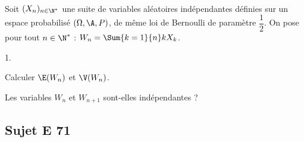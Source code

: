 \documentclass[11pt]{article}%
\begin{document}

\begin{exerciceSP}~\\
  Soit $(X_n)_{n\in\N^*}$ une suite de variables aléatoires
  indépendantes définies sur un espace probabilisé $(\Omega,\A,P)$, de
  même loi de Bernoulli de paramètre $\dfrac{1}{2}$. On pose pour tout
  $n\in\N^*$ : $W_n=\Sum{k=1}{n} k X_k$.
  \begin{noliste}{1.}
    \setlength{\itemsep}{2mm}
  \item Calculer $\E(W_n)$ et $\V(W_n)$.
  \item Les variables $W_n$ et $W_{n+1}$ sont-elles indépendantes ?
  \end{noliste}
\end{exerciceSP}



\subsection*{Sujet E 71}

\end{document}
